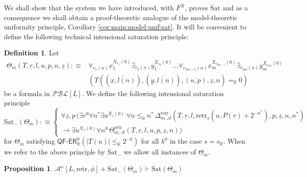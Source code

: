 \documentclass[11pt]{amsart}
\newtheorem{proposition}[theorem]{Proposition}
\theoremstyle{definition}
\newtheorem{definition}[theorem]{Definition}
\theoremstyle{remark}
\def\RR{\mathbb{R}}
\newcommand{\QFER}{\textsf{QF}\mbox{-}\textsf{ER}}
\begin{document}
 We shall show that the system we have introduced, with $F^X$, proves $\mathrm{Sat}$ and as a consequence we shall obtain a proof-theoretic analogue of the model-theoretic uniformity principle, Corollary \ref{cor:main:model:unif:sat}. It will be convenient to define the following technical intensional saturation principle:
\begin{definition}
 Let
 \begin{align*}
\Theta_m(T,\underline{r},l,u,p,n,\underline{z}):\equiv &\forall_{r_1(n)} x_1^{X_{s_1}(0)} \exists_{r_2(n)} y_1^{X_{s_2}(0)} \ldots \forall_{r_{2m-1}(n)} x_m^{X_{s_{2m-1}}(0)}\exists_{r_{2m}(n)} y_m^{X_{s_{2m}}(0)}\\&(T((\overline{\underline{x},l(n)}),(\overline{\underline{y},l(n)}),(\overline{u,p}),\underline{z},n)=_\RR 0)
\end{align*}
be a formula in $\mathcal{PBL}[L]$. We define the following
intensional saturation principle
\[
\mathrm{Sat}_{-}(\Theta_m):\equiv
\begin{cases}
    \forall \underline{z},p\,(\exists r^0\forall n^*\exists u^{X_s(0)}\, \forall n\le_0 n^*\, \Delta^\mathrm{retr}_{m,\mathcal{A}}(T,\underline{r},l,\mathrm{retr}_s(u,P(r)+2^{-n^*}),p,\underline{z},n,n^*)\\
    \to \exists u^{X_s(0)}\forall n^0\, \Theta^\mathrm{retr}_{m,\mathcal{A}}(T,\underline{r},l,u,p,\underline{z},n))
\end{cases}
\] 
for $\Theta_m$ satisfying $\QFER^0_\RR(|T(u)|\le_\RR  2^{-k})$ for all $k^0$ in the case $s=s_\RR$. When we refer to the above principle by $\mathrm{Sat}_{-}$ we allow all instances of $\Theta_m$.
\end{definition}
\begin{proposition}
\label{prop:sat:int:to}
    $\mathcal{A}^\omega[L,\mathrm{retr},\phi]+\mathrm{Sat}_{-}(\Theta_m) \vdash \mathrm{Sat}(\Theta_m) $ 
\end{proposition}
\end{document}
